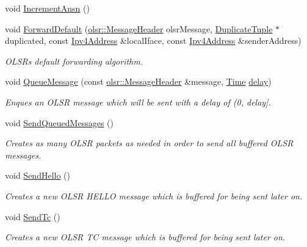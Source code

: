 \begin{DoxyCompactItemize}
void \hyperlink{classns3_1_1olsr_1_1RoutingProtocol_ac1cfaea5b2ba8a3b32e39256b0221774}{Increment\+Ansn} ()
\item 
void \hyperlink{classns3_1_1olsr_1_1RoutingProtocol_ac918fb6674847bee76fedaf16e15ba44}{Forward\+Default} (\hyperlink{classns3_1_1olsr_1_1MessageHeader}{olsr\+::\+Message\+Header} olsr\+Message, \hyperlink{structns3_1_1olsr_1_1DuplicateTuple}{Duplicate\+Tuple} $\ast$duplicated, const \hyperlink{classns3_1_1Ipv4Address}{Ipv4\+Address} \&local\+Iface, const \hyperlink{classns3_1_1Ipv4Address}{Ipv4\+Address} \&sender\+Address)
\begin{DoxyCompactList}\small\item\em O\+L\+SR\textquotesingle{}s default forwarding algorithm. \end{DoxyCompactList}\item 
void \hyperlink{classns3_1_1olsr_1_1RoutingProtocol_a206c7c0bba382cba1ac50d11a7df88f3}{Queue\+Message} (const \hyperlink{classns3_1_1olsr_1_1MessageHeader}{olsr\+::\+Message\+Header} \&message, \hyperlink{classns3_1_1Time}{Time} \hyperlink{mmwave_2model_2fading-traces_2fading__trace__generator_8m_a7964e6aa8f61a9d28973c8267a606ad8}{delay})
\begin{DoxyCompactList}\small\item\em Enques an O\+L\+SR message which will be sent with a delay of (0, delay\mbox{]}. \end{DoxyCompactList}\item 
void \hyperlink{classns3_1_1olsr_1_1RoutingProtocol_a0ee7494c6ac857210f7f12d40d39e349}{Send\+Queued\+Messages} ()
\begin{DoxyCompactList}\small\item\em Creates as many O\+L\+SR packets as needed in order to send all buffered O\+L\+SR messages. \end{DoxyCompactList}\item 
void \hyperlink{classns3_1_1olsr_1_1RoutingProtocol_a3b24f29bfb5d4bfa60e0ca1eb28a8b13}{Send\+Hello} ()
\begin{DoxyCompactList}\small\item\em Creates a new O\+L\+SR H\+E\+L\+LO message which is buffered for being sent later on. \end{DoxyCompactList}\item 
void \hyperlink{classns3_1_1olsr_1_1RoutingProtocol_a78a41697a6d747bde67d5cb2cd13a4bd}{Send\+Tc} ()
\begin{DoxyCompactList}\small\item\em Creates a new O\+L\+SR TC message which is buffered for being sent later on. \end{DoxyCompactList}\item 

\end{DoxyCompactItemize}
